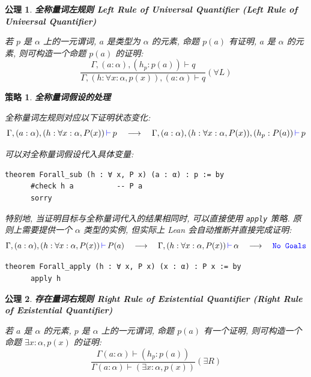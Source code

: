 \documentclass[UTF8]{ctexart}
\DeclareMathOperator{\0}{\mathbf{0}}                    %
\newcommand{\<}{\langle}
\renewcommand{\>}{\rangle}                              %
\newenvironment{thm_box}{
    \begin{tcolorbox}[enhanced, colback=thm_blue2, boxrule=0pt, frame hidden,
        borderline west={0.7mm}{0.1mm}{thm_blue1},breakable]
    }
    {\end{tcolorbox}}
\newenvironment{axm_box}{
    \begin{tcolorbox}[enhanced, colback=axm_yellow2, boxrule=0pt, frame hidden,
        borderline west={0.7mm}{0.1mm}{axm_yellow1},breakable]
    }
    {\end{tcolorbox}}
\theoremstyle{MyStyle} %
\newtheorem{axiom}{公理}[section]
\newenvironment{axm}[2]
{
    \begin{axm_box}
        \begin{axiom}
            \textbf{#1
                \ifx\relax#2\relax\else %
                    (#2) %
                \fi}
            \newline
}
{
        \end{axiom}
    \end{axm_box}
}
\newtheorem{mytactic}{策略}
\newenvironment{tactic}[1]
{
    \begin{thm_box}
        \begin{mytactic}
            \textbf{#1}
            \newline
}
{
        \end{mytactic}
    \end{thm_box}
}
\newcommand*{\lean}[1]{\texttt{\color{blue}#1}}
\newcommand{\Goal}{\texttt{\,\color{leanblue}\ensuremath{\vdash}\,}}
\begin{document}
        \begin{axm}
            {全称量词左规则}
            {Left Rule of Universal Quantifier}
            若 $p$ 是 $\alpha$ 上的一元谓词, $a$ 是类型为 $\alpha$ 的元素, 命题 $p(a)$ 有证明, $a$ 是 $\alpha$ 的元素, 则可构造一个命题 $p(a)$ 的证明: 
            \[\frac{\Gamma,(a : \alpha), (h_p : p(a))\vdash q}{\Gamma, (h : \forall x : \alpha, p(x)), (a : \alpha)\vdash q}(\forall L)\]
        \end{axm}

        \begin{tactic}
            {全称量词假设的处理}
            全称量词左规则对应以下证明状态变化: 
            \[\Gamma, (a : \alpha), (h : \forall x : \alpha, P(x))\Goal p\quad\longrightarrow\quad\Gamma, (a : \alpha), (h : \forall x : \alpha, P(x)), (h_p : P(a))\Goal p\]

            可以对全称量词假设代入具体变量: 
            \begin{lstlisting}[style=lean]
    theorem Forall_sub (h : ∀ x, P x) (a : α) : p := by
      #check h a          -- P a
      sorry     
            \end{lstlisting}

            特别地, 当证明目标与全称量词代入的结果相同时, 可以直接使用 \lean{apply} 策略. 原则上需要提供一个 $\alpha$ 类型的实例, 但实际上 Lean 会自动推断并直接完成证明: 
            \[\Gamma, (a : \alpha), (h : \forall x : \alpha, P(x))\Goal P(a)\quad\longrightarrow\quad\Gamma, (h : \forall x : \alpha, P(x))\Goal\alpha\quad\longrightarrow\quad\lean{No Goals}\]
            \begin{lstlisting}[style=lean]
    theorem Forall_apply (h : ∀ x, P x) (x : α) : P x := by
      apply h
            \end{lstlisting}
        \end{tactic}

        \begin{axm}
            {存在量词右规则}
            {Right Rule of Existential Quantifier}
            若 $a$ 是 $\alpha$ 的元素, $p$ 是 $\alpha$ 上的一元谓词, 命题 $p(a)$ 有一个证明, 则可构造一个命题 $\exists x : \alpha, p(x)$ 的证明: 
            \[\frac{\Gamma(a : \alpha)\vdash(h_p : p(a))}{\Gamma(a : \alpha)\vdash(\exists x : \alpha, p(x))}(\exists R)\]
        \end{axm}
\end{document}
